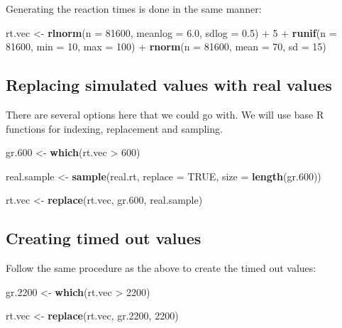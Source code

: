 \documentclass[]{article}
\newenvironment{Shaded}{\begin{snugshade}}{\end{snugshade}}
\newcommand{\KeywordTok}[1]{\textcolor[rgb]{0.13,0.29,0.53}{\textbf{{#1}}}}
\newcommand{\DataTypeTok}[1]{\textcolor[rgb]{0.13,0.29,0.53}{{#1}}}
\newcommand{\DecValTok}[1]{\textcolor[rgb]{0.00,0.00,0.81}{{#1}}}
\newcommand{\FloatTok}[1]{\textcolor[rgb]{0.00,0.00,0.81}{{#1}}}
\newcommand{\StringTok}[1]{\textcolor[rgb]{0.31,0.60,0.02}{{#1}}}
\newcommand{\OtherTok}[1]{\textcolor[rgb]{0.56,0.35,0.01}{{#1}}}
\newcommand{\NormalTok}[1]{{#1}}
\begin{document}
Generating the reaction times is done in the same manner:

\begin{Shaded}
\begin{Highlighting}[]
\NormalTok{rt.vec <-}\StringTok{ }
\StringTok{  }\KeywordTok{rlnorm}\NormalTok{(}\DataTypeTok{n =} \DecValTok{81600}\NormalTok{, }\DataTypeTok{meanlog =} \FloatTok{6.0}\NormalTok{, }\DataTypeTok{sdlog =} \FloatTok{0.5}\NormalTok{) +}\StringTok{ }\DecValTok{5} \NormalTok{+}
\StringTok{    }\KeywordTok{runif}\NormalTok{(}\DataTypeTok{n =} \DecValTok{81600}\NormalTok{, }\DataTypeTok{min =} \DecValTok{10}\NormalTok{, }\DataTypeTok{max =} \DecValTok{100}\NormalTok{) +}
\StringTok{    }\KeywordTok{rnorm}\NormalTok{(}\DataTypeTok{n =} \DecValTok{81600}\NormalTok{, }\DataTypeTok{mean =} \DecValTok{70}\NormalTok{, }\DataTypeTok{sd =} \DecValTok{15}\NormalTok{)}
\end{Highlighting}
\end{Shaded}

\subsection{Replacing simulated values with real
values}\label{replacing-simulated-values-with-real-values}

There are several options here that we could go with. We will use base R
functions for indexing, replacement and sampling.

\begin{Shaded}
\begin{Highlighting}[]
\NormalTok{gr}\FloatTok{.600} \NormalTok{<-}\StringTok{ }\KeywordTok{which}\NormalTok{(rt.vec >}\StringTok{ }\DecValTok{600}\NormalTok{)}

\NormalTok{real.sample <-}\StringTok{ }\KeywordTok{sample}\NormalTok{(real.rt, }\DataTypeTok{replace =} \OtherTok{TRUE}\NormalTok{, }\DataTypeTok{size =} \KeywordTok{length}\NormalTok{(gr}\FloatTok{.600}\NormalTok{))}

\NormalTok{rt.vec <-}\StringTok{ }\KeywordTok{replace}\NormalTok{(rt.vec, gr}\FloatTok{.600}\NormalTok{, real.sample)}
\end{Highlighting}
\end{Shaded}

\subsection{Creating timed out
values}\label{creating-timed-out-values-1}

Follow the same procedure as the above to create the timed out values:

\begin{Shaded}
\begin{Highlighting}[]
\NormalTok{gr}\FloatTok{.2200} \NormalTok{<-}\StringTok{ }\KeywordTok{which}\NormalTok{(rt.vec >}\StringTok{ }\DecValTok{2200}\NormalTok{)}

\NormalTok{rt.vec <-}\StringTok{ }\KeywordTok{replace}\NormalTok{(rt.vec, gr}\FloatTok{.2200}\NormalTok{, }\DecValTok{2200}\NormalTok{)}
\end{Highlighting}
\end{Shaded}
\end{document}
